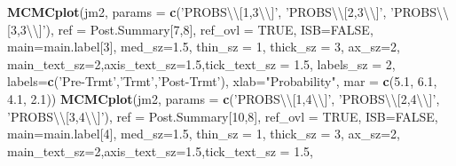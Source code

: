 \documentclass[]{article}
\newenvironment{Shaded}{\begin{snugshade}}{\end{snugshade}}
\newcommand{\CharTok}[1]{\textcolor[rgb]{0.31,0.60,0.02}{#1}}
\newcommand{\DataTypeTok}[1]{\textcolor[rgb]{0.13,0.29,0.53}{#1}}
\newcommand{\DecValTok}[1]{\textcolor[rgb]{0.00,0.00,0.81}{#1}}
\newcommand{\FloatTok}[1]{\textcolor[rgb]{0.00,0.00,0.81}{#1}}
\newcommand{\KeywordTok}[1]{\textcolor[rgb]{0.13,0.29,0.53}{\textbf{#1}}}
\newcommand{\NormalTok}[1]{#1}
\newcommand{\OtherTok}[1]{\textcolor[rgb]{0.56,0.35,0.01}{#1}}
\newcommand{\StringTok}[1]{\textcolor[rgb]{0.31,0.60,0.02}{#1}}
\begin{document}
\begin{Shaded}
\begin{Highlighting}[]
\KeywordTok{MCMCplot}\NormalTok{(jm2, }\DataTypeTok{params =} \KeywordTok{c}\NormalTok{(}\StringTok{'PROBS}\CharTok{\textbackslash{}\textbackslash{}}\StringTok{[1,3}\CharTok{\textbackslash{}\textbackslash{}}\StringTok{]'}\NormalTok{, }\StringTok{'PROBS}\CharTok{\textbackslash{}\textbackslash{}}\StringTok{[2,3}\CharTok{\textbackslash{}\textbackslash{}}\StringTok{]'}\NormalTok{, }\StringTok{'PROBS}\CharTok{\textbackslash{}\textbackslash{}}\StringTok{[3,3}\CharTok{\textbackslash{}\textbackslash{}}\StringTok{]'}\NormalTok{), }\DataTypeTok{ref =}\NormalTok{ Post.Summary[}\DecValTok{7}\NormalTok{,}\DecValTok{8}\NormalTok{], }
         \DataTypeTok{ref_ovl =} \OtherTok{TRUE}\NormalTok{, }\DataTypeTok{ISB=}\OtherTok{FALSE}\NormalTok{, }
         \DataTypeTok{main=}\NormalTok{main.label[}\DecValTok{3}\NormalTok{],}
         \DataTypeTok{med_sz=}\FloatTok{1.5}\NormalTok{, }\DataTypeTok{thin_sz =} \DecValTok{1}\NormalTok{, }\DataTypeTok{thick_sz =} \DecValTok{3}\NormalTok{, }\DataTypeTok{ax_sz=}\DecValTok{2}\NormalTok{, }\DataTypeTok{main_text_sz=}\DecValTok{2}\NormalTok{,}\DataTypeTok{axis_text_sz=}\FloatTok{1.5}\NormalTok{,}\DataTypeTok{tick_text_sz =} \FloatTok{1.5}\NormalTok{, }
         \DataTypeTok{labels_sz =} \DecValTok{2}\NormalTok{,}
         \DataTypeTok{labels=}\KeywordTok{c}\NormalTok{(}\StringTok{'Pre-Trmt'}\NormalTok{,}\StringTok{'Trmt'}\NormalTok{,}\StringTok{'Post-Trmt'}\NormalTok{), }\DataTypeTok{xlab=}\StringTok{"Probability"}\NormalTok{,}
         \DataTypeTok{mar =} \KeywordTok{c}\NormalTok{(}\FloatTok{5.1}\NormalTok{, }\FloatTok{6.1}\NormalTok{, }\FloatTok{4.1}\NormalTok{, }\FloatTok{2.1}\NormalTok{))}
\KeywordTok{MCMCplot}\NormalTok{(jm2, }\DataTypeTok{params =} \KeywordTok{c}\NormalTok{(}\StringTok{'PROBS}\CharTok{\textbackslash{}\textbackslash{}}\StringTok{[1,4}\CharTok{\textbackslash{}\textbackslash{}}\StringTok{]'}\NormalTok{, }\StringTok{'PROBS}\CharTok{\textbackslash{}\textbackslash{}}\StringTok{[2,4}\CharTok{\textbackslash{}\textbackslash{}}\StringTok{]'}\NormalTok{, }\StringTok{'PROBS}\CharTok{\textbackslash{}\textbackslash{}}\StringTok{[3,4}\CharTok{\textbackslash{}\textbackslash{}}\StringTok{]'}\NormalTok{), }\DataTypeTok{ref =}\NormalTok{ Post.Summary[}\DecValTok{10}\NormalTok{,}\DecValTok{8}\NormalTok{], }
         \DataTypeTok{ref_ovl =} \OtherTok{TRUE}\NormalTok{, }\DataTypeTok{ISB=}\OtherTok{FALSE}\NormalTok{, }
         \DataTypeTok{main=}\NormalTok{main.label[}\DecValTok{4}\NormalTok{],}
         \DataTypeTok{med_sz=}\FloatTok{1.5}\NormalTok{, }\DataTypeTok{thin_sz =} \DecValTok{1}\NormalTok{, }\DataTypeTok{thick_sz =} \DecValTok{3}\NormalTok{, }\DataTypeTok{ax_sz=}\DecValTok{2}\NormalTok{, }\DataTypeTok{main_text_sz=}\DecValTok{2}\NormalTok{,}\DataTypeTok{axis_text_sz=}\FloatTok{1.5}\NormalTok{,}\DataTypeTok{tick_text_sz =} \FloatTok{1.5}\NormalTok{, }

\end{Highlighting}
\end{Shaded}
\end{document}
